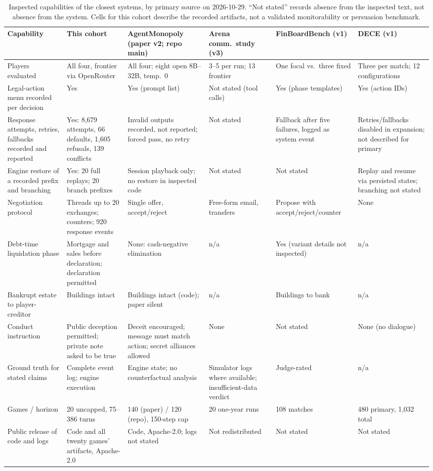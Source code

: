 \begin{table}[t]
\centering\footnotesize
\begin{tabularx}{\linewidth}{@{}L{2.9cm}YYYYY@{}}
\toprule
Capability & This cohort & AgentMonopoly (paper v2; repo main) & Arena comm.\ study (v3) & FinBoardBench (v1) & DECE (v1)\\
\midrule
Players evaluated & All four, frontier via OpenRouter & All four; eight open 8B--32B, temp.\ 0 & 3--5 per run; 13 frontier & One focal vs.\ three fixed & Three per match; 12 configurations\\
Legal-action menu recorded per decision & Yes & Yes (prompt list) & Not stated (tool calls) & Yes (phase templates) & Yes (action IDs)\\
Response attempts, retries, fallbacks recorded and reported & Yes: 8,679 attempts, 66 defaults, 1,605 refusals, 139 conflicts & Invalid outputs recorded, not reported; forced pass, no retry & Not stated & Fallback after five failures, logged as system event & Retries/fallbacks disabled in expansion; not described for primary\\
Engine restore of a recorded prefix and branching & Yes: 20 full replays; 20 branch prefixes & Session playback only; no restore in inspected code & Not stated & Not stated & Replay and resume via persisted states; branching not stated\\
Negotiation protocol & Threads up to 20 exchanges; counters; 920 response events & Single offer, accept/reject & Free-form email, transfers & Propose with accept/reject/counter & None\\
Debt-time liquidation phase & Mortgage and sales before declaration; declaration permitted & None: cash-negative elimination & n/a & Yes (variant details not inspected) & n/a\\
Bankrupt estate to player-creditor & Buildings intact & Buildings intact (code); paper silent & n/a & Buildings to bank & n/a\\
Conduct instruction & Public deception permitted; private note asked to be true & Deceit encouraged; message must match action; secret alliances allowed & None & Not stated & None (no dialogue)\\
Ground truth for stated claims & Complete event log; engine execution & Engine state; no counterfactual analysis & Simulator logs where available; insufficient-data verdict & Judge-rated & n/a\\
Games / horizon & 20 uncapped, 75--386 turns & 140 (paper) / 120 (repo), 150-step cap & 20 one-year runs & 108 matches & 480 primary, 1,032 total\\
Public release of code and logs & Code and all twenty games' artifacts, Apache-2.0 & Code, Apache-2.0; logs not stated & Not redistributed & Not stated & Not stated\\
\bottomrule
\end{tabularx}
\caption{Inspected capabilities of the closest systems, by primary source on 2026-10-29. ``Not stated'' records absence from the inspected text, not absence from the system. Cells for this cohort describe the recorded artifacts, not a validated monitorability or persuasion benchmark.}
\label{tab:capability-matrix}
\end{table}

